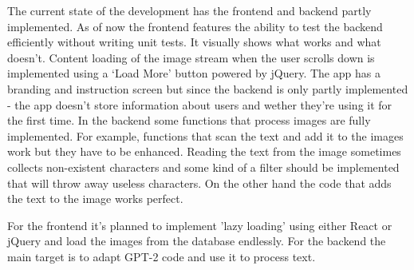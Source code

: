 \documentclass[12pt]{report}
\begin{document}
    The current state of the development has the frontend and backend partly implemented. As of now the frontend features the ability to test the backend efficiently without writing unit tests. It visually shows what works and what doesn't. Content loading of the image stream when the user scrolls down is implemented using a `Load More' button powered by jQuery. The app has a branding and instruction screen but since the backend is only partly implemented - the app doesn't store information about users and wether they're using it for the first time.
    In the backend some functions that process images are fully implemented. For example, functions that scan the text and add it to the images work but they have to be enhanced. Reading the text from the image sometimes collects non-existent characters and some kind of a filter should be implemented that will throw away useless characters. On the other hand the code that adds the text to the image works perfect.

    For the frontend it's planned to implement 'lazy loading' using either React or jQuery and load the images from the database endlessly. 
    For the backend the main target is to adapt GPT-2 code and use it to process text.

    {}
    
\end{document}
